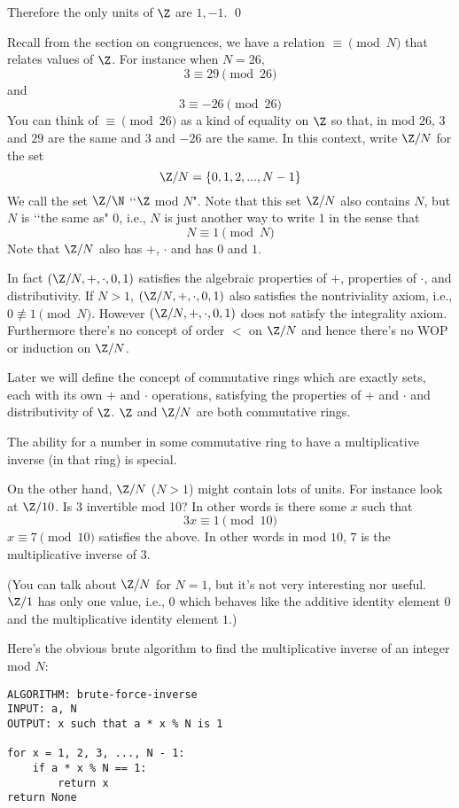 Therefore the only units of $\Z$ are $1, -1$.
\qed

Recall from the section on congruences, we have a relation $\equiv \pmod{N}$
that relates values of $\Z$.
For instance when $N = 26$,
\[
3 \equiv 29 \pmod{26}
\]
and
\[
3 \equiv -26 \pmod{26}
\]
You can think of $\equiv \pmod{26}$ as a kind of equality on $\Z$
so that, in mod $26$, $3$ and $29$ are the same and $3$ and $-26$
are the same.
In this context, write $\Z/N$ for the set
\[
\Z/N = \{0, 1, 2, ..., N - 1\}
\]
We call the set $\Z/\N$ \lq\lq $\Z$ mod $N$".
Note that this set $\Z/N$ also contains $N$, but $N$ is \lq\lq the same as" $0$, i.e.,
$N$ is just another way to write $1$ in the sense that
\[
N \equiv 1 \pmod{N}
\]
Note that $\Z/N$ also has $+$, $\cdot$ and has $0$ and $1$.

In fact $(\Z/N, +, \cdot, 0, 1)$ satisfies the algebraic properties of $+$, 
properties of $\cdot$, and distributivity.
If $N > 1$, $(\Z/N, +, \cdot, 0, 1)$ also satisfies the nontriviality
axiom, i.e., $0 \not\equiv 1 \pmod{N}$.
However $(\Z/N, +, \cdot, 0, 1)$ does not satisfy the integrality
axiom. Furthermore there's no concept of order $<$ on $\Z/N$
and hence there's no WOP or induction on $\Z/N$.

Later we will define the concept of commutative rings
which are exactly sets, each with its own $+$ and $\cdot$ operations,
satisfying the properties of $+$ and $\cdot$ and distributivity of $\Z$.
$\Z$ and $\Z/N$ are both commutative rings.

The ability for a number in some commutative ring
to have a multiplicative inverse (in that ring) is special.

On the other hand, $\Z/N$ ($N > 1$) might contain lots of units.
For instance look at $\Z/10$.
Is $3$ invertible mod 10?
In other words is there some $x$ such that
\[
3x \equiv 1 \pmod{10}
\]
$x \equiv 7 \pmod{10}$ satisfies the above.
In other words in mod $10$, $7$ is the multiplicative inverse of $3$.

(You can talk about $\Z/N$ for $N = 1$, but it's not very interesting
nor useful. $\Z/1$ has only one value, i.e., $0$ which behaves like the
additive identity element $0$ and the multiplicative identity element $1$.)

Here's the obvious brute algorithm to find the multiplicative inverse of
an integer mod $N$:

\begin{Verbatim}[frame=single,fontsize=\footnotesize]
ALGORITHM: brute-force-inverse
INPUT: a, N
OUTPUT: x such that a * x % N is 1

for x = 1, 2, 3, ..., N - 1:
    if a * x % N == 1:
        return x
return None
\end{Verbatim}


